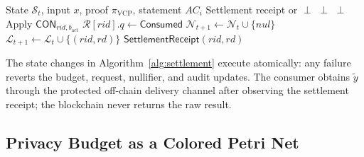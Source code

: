 \documentclass[10pt,journal,compsoc]{IEEEtran}
\begin{document}
\begin{algorithm}[!t]
\caption{Atomic VCP Verification and Settlement}
\label{alg:settlement}
\begin{algorithmic}[1]
\REQUIRE State $\mathcal{S}_t$, input $x$, proof $\pi_{\mathrm{VCP}}$, statement $AC_i$
\ENSURE Settlement receipt or $\perp$
    \RETURN $\perp$
\ENDIF
{}
    \RETURN $\perp$
\ENDIF
\STATE Apply $\mathsf{CON}_{rid,b_{\mathrm{act}}}$
\STATE $\mathcal{R}[rid].q\leftarrow\mathsf{Consumed}$
\STATE $\mathcal{N}_{t+1}\leftarrow\mathcal{N}_t\cup\{nul\}$
\STATE $\mathcal{L}_{t+1}\leftarrow\mathcal{L}_t\cup\{(rid,rd)\}$
\RETURN $\mathsf{SettlementReceipt}(rid,rd)$
\end{algorithmic}
\end{algorithm}

The state changes in Algorithm~\ref{alg:settlement} execute atomically: any failure reverts the budget, request, nullifier, and audit updates. The consumer obtains $\widetilde{y}$ through the protected off-chain delivery channel after observing the settlement receipt; the blockchain never returns the raw result.
\subsection{Privacy Budget as a Colored Petri Net}
\label{subsec:privacy_security}
\end{document}
